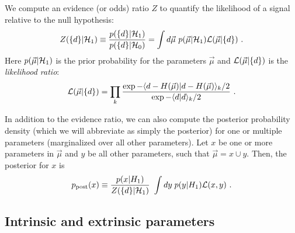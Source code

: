We compute an evidence (or odds) ratio $Z$ to quantify the likelihood of a signal relative to the null hypothesis:
\begin{equation} \label{eq:def:Z:Modified}
Z(\{d\}|{\cal H}_1) \equiv \frac{p(\{d\}|{\cal H}_1)}{p(\{d\}|{\cal H}_0)} 
  = \int d\vec{\mu}\ p(\vec{\mu}|{\cal H}_1) \Like(\vec{\mu}|\{d\})\ .
\end{equation}
Here $p(\vec{\mu}|{\cal H}_1)$ is the prior probability for the parameters $\vec{\mu}$ and ${\cal L}(\vec{\mu}|\{d\})$
is the \emph{likelihood ratio}:
\begin{equation} \label{eq:likelihood}
{\cal L}(\vec{\mu}|\{d\}) = \prod_k \frac{\exp - \langle d - H(\vec{\mu}) | d - H(\vec{\mu}) \rangle_k / 2}
{\exp - \langle d | d \rangle_k / 2}\ .
\end{equation}

In addition to the evidence ratio, we can also compute the posterior probability density 
(which we will abbreviate as simply the posterior)
for one or multiple parameters (marginalized over all other parameters). Let $x$ be one or more parameters in
$\vec{\mu}$ and $y$ be all other parameters, such that $\vec{\mu} = x \cup y$. Then, the posterior for $x$ is
\begin{equation} \label{eq:def:Posterior}
p_{\rm post}(x) \equiv \frac{p(x|H_1)}{Z(\{d\}|{\cal H}_1)} \ \int dy \;  p(y|H_1) {\cal L}(x,y)\ .
\end{equation}

\subsection{Intrinsic and extrinsic parameters}

